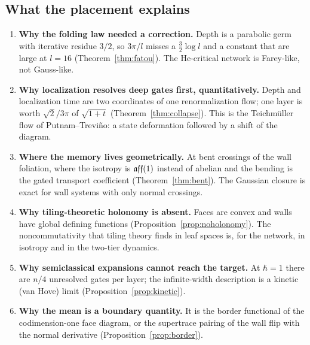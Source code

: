 \label{sec:outlook}
\subsection{What the placement explains}
\begin{enumerate}[leftmargin=*]
\item \textbf{Why the folding law needed a correction.} Depth is a parabolic germ with iterative residue $3/2$, so $3\pi/l$ misses a
$\tfrac32\log l$ and a constant that are large at $l=16$ (Theorem~\ref{thm:fatou}). The He-critical network is Farey-like, not
Gauss-like.
\item \textbf{Why localization resolves deep gates first, quantitatively.} Depth and localization time are two coordinates of one
renormalization flow; one layer is worth $\sqrt2/3\pi$ of $\sqrt{1+t}$ (Theorem~\ref{thm:collapse}). This is the Teichm\"uller flow of
Putnam--Trevi\~no: a state deformation followed by a shift of the diagram.
\item \textbf{Where the memory lives geometrically.} At bent crossings of the wall foliation, where the isotropy is $\mathfrak{aff}(1)$ instead of
abelian and the bending is the gated transport coefficient (Theorem~\ref{thm:bent}). The Gaussian closure is exact for wall systems with
only normal crossings.
\item \textbf{Why tiling-theoretic holonomy is absent.} Faces are convex and walls have global defining functions
(Proposition~\ref{prop:noholonomy}). The noncommutativity that tiling theory finds in leaf spaces is, for the network, in isotropy and in
the two-tier dynamics.
\item \textbf{Why semiclassical expansions cannot reach the target.} At $\hbar=1$ there are $n/4$ unresolved gates per layer; the
infinite-width description is a kinetic (van Hove) limit (Proposition~\ref{prop:kinetic}).
\item \textbf{Why the mean is a boundary quantity.} It is the border functional of the codimension-one face diagram, or the supertrace
pairing of the wall flip with the normal derivative (Proposition~\ref{prop:border}).
\end{enumerate}

